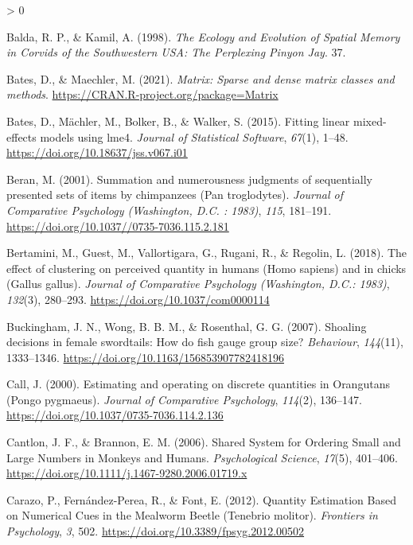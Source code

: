 \documentclass[
  english,
  ,doc,floatsintext]{apa6}
\newlength{\cslhangindent}
\newenvironment{CSLReferences}[2] %
 {%
  \setlength{\parindent}{0pt}
  \ifodd #1 \everypar{\setlength{\hangindent}{\cslhangindent}}\ignorespaces\fi
  \ifnum #2 > 0
  \setlength{\parskip}{#2\baselineskip}
  \fi
 }%
 {}
\begin{document}
\begin{CSLReferences}{1}{0}
\leavevmode\hypertarget{ref-Balda.Kamil.1998}{}%
Balda, R. P., \& Kamil, A. (1998). \emph{The {Ecology} and {Evolution} of {Spatial} {Memory} in {Corvids} of the {Southwestern} {USA}: {The} {Perplexing} {Pinyon} {Jay}}. 37.

\leavevmode\hypertarget{ref-R-Matrix}{}%
Bates, D., \& Maechler, M. (2021). \emph{Matrix: Sparse and dense matrix classes and methods}. \url{https://CRAN.R-project.org/package=Matrix}

\leavevmode\hypertarget{ref-R-lme4}{}%
Bates, D., Mächler, M., Bolker, B., \& Walker, S. (2015). Fitting linear mixed-effects models using {lme4}. \emph{Journal of Statistical Software}, \emph{67}(1), 1--48. \url{https://doi.org/10.18637/jss.v067.i01}

\leavevmode\hypertarget{ref-Beran.2001}{}%
Beran, M. (2001). Summation and numerousness judgments of sequentially presented sets of items by chimpanzees ({Pan} troglodytes). \emph{Journal of Comparative Psychology (Washington, D.C. : 1983)}, \emph{115}, 181--191. \url{https://doi.org/10.1037//0735-7036.115.2.181}

\leavevmode\hypertarget{ref-Bertamini.etal.2018}{}%
Bertamini, M., Guest, M., Vallortigara, G., Rugani, R., \& Regolin, L. (2018). The effect of clustering on perceived quantity in humans ({Homo} sapiens) and in chicks ({Gallus} gallus). \emph{Journal of Comparative Psychology (Washington, D.C.: 1983)}, \emph{132}(3), 280--293. \url{https://doi.org/10.1037/com0000114}

\leavevmode\hypertarget{ref-Buckingham.etal.2007}{}%
Buckingham, J. N., Wong, B. B. M., \& Rosenthal, G. G. (2007). Shoaling decisions in female swordtails: {How} do fish gauge group size? \emph{Behaviour}, \emph{144}(11), 1333--1346. \url{https://doi.org/10.1163/156853907782418196}

\leavevmode\hypertarget{ref-Call.2000}{}%
Call, J. (2000). Estimating and operating on discrete quantities in {Orangutans} ({Pongo} pygmaeus). \emph{Journal of Comparative Psychology}, \emph{114}(2), 136--147. \url{https://doi.org/10.1037/0735-7036.114.2.136}

\leavevmode\hypertarget{ref-Cantlon.Brannon.2006}{}%
Cantlon, J. F., \& Brannon, E. M. (2006). Shared {System} for {Ordering} {Small} and {Large} {Numbers} in {Monkeys} and {Humans}. \emph{Psychological Science}, \emph{17}(5), 401--406. \url{https://doi.org/10.1111/j.1467-9280.2006.01719.x}

\leavevmode\hypertarget{ref-Carazo.etal.2012}{}%
Carazo, P., Fernández-Perea, R., \& Font, E. (2012). Quantity {Estimation} {Based} on {Numerical} {Cues} in the {Mealworm} {Beetle} ({Tenebrio} molitor). \emph{Frontiers in Psychology}, \emph{3}, 502. \url{https://doi.org/10.3389/fpsyg.2012.00502}


\end{CSLReferences}
\end{document}
